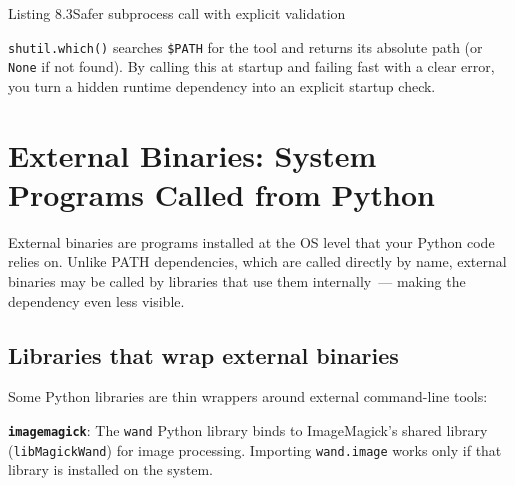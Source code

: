 \begin{codeboxcap}{\textcolor{accent}{Listing 8.3}\enspace Safer subprocess call with explicit validation}
\begin{Shaded}
\begin{Highlighting}[]
\OperatorTok{=}\NormalTok{)}

\NormalTok{) }\OperatorTok{{-}\textgreater{}} \NormalTok{:}
\OperatorTok{=}
\NormalTok{        [PANDOC\_PATH, }\NormalTok{, }\NormalTok{(output\_path)],}
\NormalTok{    )}
\end{Highlighting}
\end{Shaded}

\end{codeboxcap}

\noindent{}\texttt{shutil.which()} searches \texttt{\$PATH} for the tool and returns its absolute path (or \texttt{None} if not found). By calling this at startup and failing fast with a clear error, you turn a hidden runtime dependency into an explicit startup check.

\setcounter{section}{2}
\section{External Binaries: System Programs Called from Python}\label{08-hidden-dependencies:83-external-binaries-system-programs-called-from-python}

External binaries are programs installed at the OS level that your Python code relies on. Unlike PATH dependencies, which are called directly by name, external binaries may be called by libraries that use them internally~--- making the dependency even less visible.

\subsection*{Libraries that wrap external binaries}\label{08-hidden-dependencies:libraries-that-wrap-external-binaries}

Some Python libraries are thin wrappers around external command-line tools:

\textbf{\texttt{imagemagick}}: The \texttt{wand} Python library binds to ImageMagick's shared library (\texttt{libMagickWand}) for image processing. Importing \texttt{wand.image} works only if that library is installed on the system.

